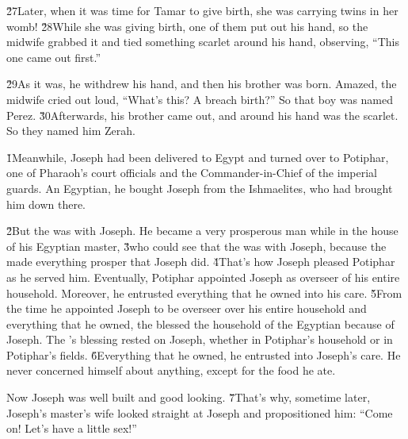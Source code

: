 \v{27}Later, when it was time for Tamar to give birth, she was carrying twins in her womb! \v{28}While she was giving birth, one of them put out his hand, so the midwife grabbed it and tied something scarlet around his hand, observing, ``This one came out first.''

\v{29}As it was, he withdrew his hand, and then his brother was born. Amazed, the midwife cried out loud, ``What's this? A breach birth?'' So that boy was named Perez. \v{30}Afterwards, his brother came out, and around his hand was the scarlet. So they named him Zerah.

\v{1}Meanwhile, Joseph had been delivered to Egypt and turned over to Potiphar, one of Pharaoh's court officials and the Commander-in-Chief of the imperial guards. An Egyptian, he bought Joseph from the Ishmaelites, who had brought him down there.

\v{2}But the  was with Joseph. He became a very prosperous man while in the house of his Egyptian master, \v{3}who could see that the  was with Joseph, because the  made everything prosper that Joseph did. \v{4}That's how Joseph pleased Potiphar as he served him. Eventually, Potiphar appointed Joseph as overseer of his entire household. Moreover, he entrusted everything that he owned into his care. \v{5}From the time he appointed Joseph to be overseer over his entire household and everything that he owned, the  blessed the household of the Egyptian because of Joseph. The 's blessing rested on Joseph, whether in Potiphar's household or in Potiphar's fields. \v{6}Everything that he owned, he entrusted into Joseph's care. He never concerned himself about anything, except for the food he ate.

Now Joseph was well built and good looking. \v{7}That's why, sometime later, Joseph's master's wife looked straight at Joseph and propositioned him: ``Come on! Let's have a little sex!''

